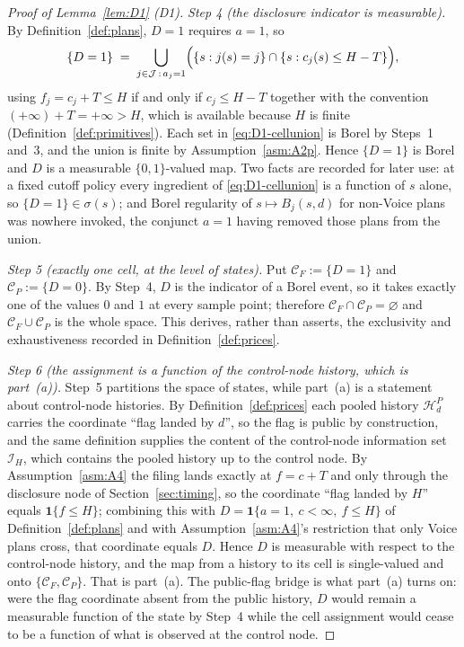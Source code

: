 \documentclass[11pt]{article}
\newcommand{\ind}{\mathbf{1}}
\begin{document}
\begin{proof}[Proof of Lemma~\ref{lem:D1} (D1)]
\emph{Step 4 (the disclosure indicator is measurable).} By Definition~\ref{def:plans}, $D=1$ requires
$a=1$, so
\begin{equation}
\label{eq:D1-cellunion}
\{D = 1\} \;=\; \bigcup_{j \in \mathcal J\,:\,a_j = 1}
  \Bigl( \{s : j(s) = j\} \cap \{s : c_j(s) \le H-T\} \Bigr),
\end{equation}
using $f_j = c_j + T \le H$ if and only if $c_j \le H-T$ together with the convention
$(+\infty)+T = +\infty > H$, which is available because $H$ is finite
(Definition~\ref{def:primitives}). Each set in \eqref{eq:D1-cellunion} is Borel by Steps~1 and~3, and
the union is finite by Assumption~\ref{asm:A2p}. Hence $\{D=1\}$ is Borel and $D$ is a measurable
$\{0,1\}$-valued map. Two facts are recorded for later use: at a fixed cutoff policy every ingredient
of \eqref{eq:D1-cellunion} is a function of $s$ alone, so $\{D=1\} \in \sigma(s)$; and Borel
regularity of $s \mapsto B_j(s,d)$ for non-Voice plans was nowhere invoked, the conjunct $a=1$ having
removed those plans from the union.

\emph{Step 5 (exactly one cell, at the level of states).} Put $\mathcal C_F := \{D=1\}$ and
$\mathcal C_P := \{D=0\}$. By Step~4, $D$ is the indicator of a Borel event, so it takes exactly one
of the values $0$ and $1$ at every sample point; therefore $\mathcal C_F \cap \mathcal C_P =
\varnothing$ and $\mathcal C_F \cup \mathcal C_P$ is the whole space. This derives, rather than
asserts, the exclusivity and exhaustiveness recorded in Definition~\ref{def:prices}.

\emph{Step 6 (the assignment is a function of the control-node history, which is part~(a)).} Step~5
partitions the space of states, while part~(a) is a statement about control-node histories. By
Definition~\ref{def:prices} each pooled history $\mathcal H_d^P$ carries the coordinate ``flag landed
by $d$'', so the flag is public by construction, and the same definition supplies the content of the
control-node information set $\mathcal I_H$, which contains the pooled history up to the control
node. By Assumption~\ref{asm:A4} the filing lands exactly at $f = c+T$ and only through the
disclosure node of Section~\ref{sec:timing}, so the coordinate ``flag landed by $H$'' equals
$\ind\{f \le H\}$; combining this with $D = \ind\{a=1,\ c<\infty,\ f \le H\}$ of
Definition~\ref{def:plans} and with Assumption~\ref{asm:A4}'s restriction that only Voice plans
cross, that coordinate equals $D$. Hence $D$ is measurable with respect to the control-node history,
and the map from a history to its cell is single-valued and onto
$\{\mathcal C_F,\mathcal C_P\}$. That is part~(a). The public-flag bridge is what part~(a) turns on:
were the flag coordinate absent from the public history, $D$ would remain a measurable function of
the state by Step~4 while the cell assignment would cease to be a function of what is observed at the
control node.


\end{proof}
\end{document}
